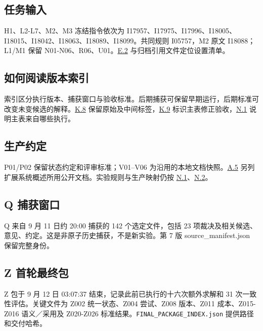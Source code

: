 \subsection[任务输入]{\texorpdfstring{\protect\hypertarget{k1}{}任务输入}{任务输入}}
H1、L2-L7、M2、M3 冻结指令依次为 I17957、I17975、I17996、I18005、I18015、I18042、I18063、I18089、I18099。共同规则 I05757，M2 原文 I18088；L1/M1 保留 N01-N06、R06、U01。\hyperlink{e2}{E.2} 与归档引用文件定位设置清单。

\subsection[如何阅读版本索引]{\texorpdfstring{\protect\hypertarget{k2}{}如何阅读版本索引}{如何阅读版本索引}}
索引区分执行版本、捕获窗口与验收标准。后期捕获可保留早期运行，后期标准可改变未变候选的解释。\hyperlink{k8}{K.8} 保留原始及中间标签，\hyperlink{k9}{K.9} 标识主表修正验收，\hyperlink{n1}{N.1} 说明主表来自哪些执行。

\subsection[生产约定]{\texorpdfstring{\protect\hypertarget{k3}{}生产约定}{生产约定}}
P01/P02 保留状态约定和评审标准；V01–V06 为沿用的本地文档快照。\hyperlink{a5}{A.5} 另列扩展系统概述所用公开文档。实验规则与生产映射仍按 \hyperlink{n1}{N.1}、\hyperlink{n2}{N.2}。

\subsection[Q 捕获窗口]{\texorpdfstring{\protect\hypertarget{k4}{}Q 捕获窗口}{Q 捕获窗口}}
Q 来自 9 月 11 日约 20:00 捕获的 142 个选定文件，包括 23 项裁决及相关候选、意见、约定。这是非原子历史捕获，不是新实验。第 7 版 source\_manifest.json 保留完整身份。

\subsection[Z 首轮最终包]{\texorpdfstring{\protect\hypertarget{k5}{}Z 首轮最终包}{Z 首轮最终包}}
Z 包于 9 月 12 日 03:07:37 结束，记录此前已执行的十六次额外求解和 31 次一致性评估。关键文件为 Z002 统一状态、Z004 尝试、Z008 版本、Z011 成本、Z015-Z016 语义／采用及 Z020-Z026 标准结果。\nolinkurl{FINAL_PACKAGE_INDEX.json} 提供路径和交付哈希。

